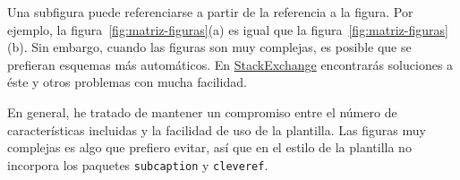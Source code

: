 Una subfigura puede referenciarse a partir de la referencia a la figura.  Por ejemplo, la figura~\ref{fig:matriz-figuras}(a) es igual que la figura~\ref{fig:matriz-figuras}(b). Sin embargo, cuando las figuras son muy complejas, es posible que se prefieran esquemas más automáticos.  En \href{https://tex.stackexchange.com/questions/181225/how-to-reference-to-subfigure-in-latex}{StackExchange} encontrarás soluciones a éste y otros problemas con mucha facilidad.

En general, he tratado de mantener un compromiso entre el número de características incluidas y la facilidad de uso de la plantilla.  Las figuras muy complejas es algo que prefiero evitar, así que en el estilo de la plantilla no incorpora los paquetes \texttt{subcaption} y \texttt{cleveref}.
